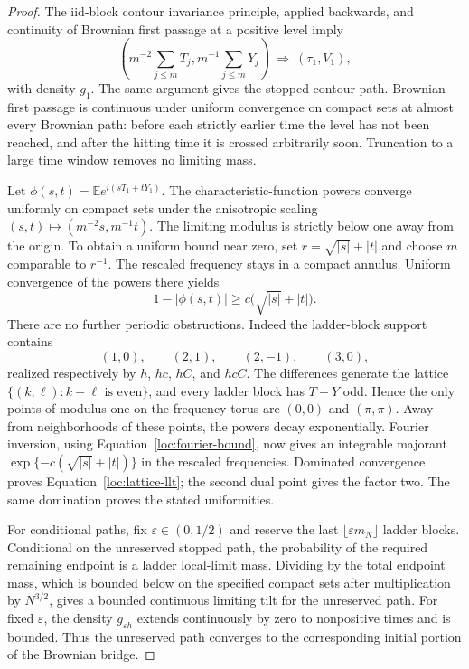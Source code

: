 \begin{proof}
The iid-block contour invariance principle, applied backwards, and
continuity of Brownian first passage at a positive level imply
\[
 \left(m^{-2}\sum_{j\le m}T_j,
       m^{-1}\sum_{j\le m}Y_j\right)
 \ \Longrightarrow\ (\tau_1,V_1),
\]
with density $g_1$.  The same argument gives the stopped contour path.
Brownian first passage is continuous under uniform convergence on compact
sets at almost every Brownian path: before each strictly earlier time the
level has not been reached, and after the hitting time it is crossed
arbitrarily soon.  Truncation to a large time window removes no limiting
mass.

Let $\phi(s,t)=\mathbb E e^{i(sT_1+tY_1)}$.  The characteristic-function
powers converge uniformly on compact sets under the anisotropic scaling
$(s,t)\mapsto(m^{-2}s,m^{-1}t)$.  The limiting modulus is strictly below
one away from the origin.  To obtain a uniform bound near zero, set
$r=\sqrt{|s|}+|t|$ and choose $m$ comparable to $r^{-1}$.  The rescaled
frequency stays in a compact annulus.  Uniform convergence of the powers
there yields
\begin{equation}\label{loc:fourier-bound}
 1-|\phi(s,t)|\ge c\bigl(\sqrt{|s|}+|t|\bigr).
\end{equation}
There are no further periodic obstructions.  Indeed the ladder-block
support contains
\[
 (1,0),\qquad (2,1),\qquad (2,-1),\qquad (3,0),
\]
realized respectively by
$h$, $hc$, $hC$, and $hcC$.  The differences generate the lattice
$\{(k,\ell):k+\ell\text{ is even}\}$, and every ladder block has
$T+Y$ odd.  Hence the only points of modulus one on the frequency torus
are $(0,0)$ and $(\pi,\pi)$.  Away from neighborhoods of these points,
the powers decay exponentially.  Fourier inversion, using
Equation~\eqref{loc:fourier-bound}, now gives an integrable majorant
$\exp\{-c(\sqrt{|s|}+|t|)\}$ in the rescaled frequencies.  Dominated
convergence proves Equation~\eqref{loc:lattice-llt}; the second dual
point gives the factor two.  The same domination proves the stated
uniformities.

For conditional paths, fix $\varepsilon\in(0,1/2)$ and reserve the last
$\lfloor\varepsilon m_N\rfloor$ ladder blocks.  Conditional on the
unreserved stopped path, the probability of the required remaining
endpoint is a ladder local-limit mass.  Dividing by the total endpoint
mass, which is bounded below on the specified compact sets after
multiplication by $N^{3/2}$, gives a bounded continuous limiting tilt for
the unreserved path.  For fixed $\varepsilon$, the density
$g_{\varepsilon h}$ extends continuously by zero to nonpositive times
and is bounded.  Thus the unreserved path converges to the corresponding
initial portion of the Brownian bridge.


\end{proof}
